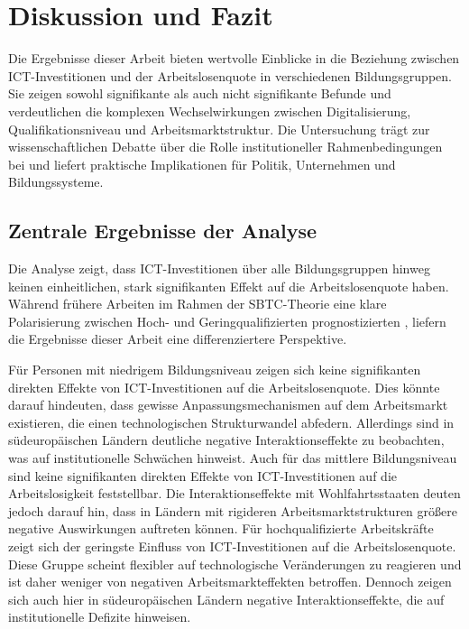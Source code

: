 
\section{Diskussion und Fazit}

Die Ergebnisse dieser Arbeit bieten wertvolle Einblicke in die Beziehung zwischen 
\ac{ICT}-Investitionen und der Arbeitslosenquote in verschiedenen Bildungsgruppen. Sie 
zeigen sowohl signifikante als auch nicht signifikante Befunde und verdeutlichen die 
komplexen Wechselwirkungen zwischen Digitalisierung, Qualifikationsniveau und 
Arbeitsmarktstruktur. Die Untersuchung trägt zur wissenschaftlichen Debatte über die 
Rolle institutioneller Rahmenbedingungen bei und liefert praktische Implikationen für 
Politik, Unternehmen und Bildungssysteme.

\subsection{Zentrale Ergebnisse der Analyse}

Die Analyse zeigt, dass \ac{ICT}-Investitionen über alle Bildungsgruppen hinweg keinen 
einheitlichen, stark signifikanten Effekt auf die Arbeitslosenquote haben. Während 
frühere Arbeiten im Rahmen der \ac{SBTC}-Theorie eine klare Polarisierung zwischen 
Hoch- und Geringqualifizierten prognostizierten \parencite[S. 7–10]{acemoglu2002technical}, 
liefern die Ergebnisse dieser Arbeit eine differenziertere Perspektive.

Für Personen mit niedrigem Bildungsniveau zeigen sich keine signifikanten direkten 
Effekte von \ac{ICT}-Investitionen auf die Arbeitslosenquote. Dies könnte darauf 
hindeuten, dass gewisse Anpassungsmechanismen auf dem Arbeitsmarkt existieren, die 
einen technologischen Strukturwandel abfedern. Allerdings sind in südeuropäischen 
Ländern deutliche negative Interaktionseffekte zu beobachten, was auf institutionelle 
Schwächen hinweist. Auch für das mittlere Bildungsniveau sind keine signifikanten 
direkten Effekte von \ac{ICT}-Investitionen auf die Arbeitslosigkeit feststellbar. Die 
Interaktionseffekte mit Wohlfahrtsstaaten deuten jedoch darauf hin, dass in Ländern 
mit rigideren Arbeitsmarktstrukturen größere negative Auswirkungen auftreten können. 
Für hochqualifizierte Arbeitskräfte zeigt sich der geringste Einfluss von 
\ac{ICT}-Investitionen auf die Arbeitslosenquote. Diese Gruppe scheint flexibler auf 
technologische Veränderungen zu reagieren und ist daher weniger von negativen 
Arbeitsmarkteffekten betroffen. Dennoch zeigen sich auch hier in südeuropäischen Ländern 
negative Interaktionseffekte, die auf institutionelle Defizite hinweisen.

